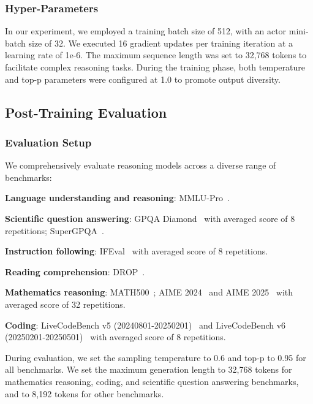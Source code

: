 \documentclass[11pt, a4paper, logo, copyright, nonumbering]{xiaomi}
\begin{document}
\subsubsection{Hyper-Parameters}
In our experiment, we employed a training batch size of 512, with an actor mini-batch size of 32. We executed 16 gradient updates per training iteration at a learning rate of 1e-6. The maximum sequence length was set to 32,768 tokens to facilitate complex reasoning tasks. During the training phase, both temperature and top-p parameters were configured at 1.0 to promote output diversity.






\subsection{Post-Training Evaluation}



\subsubsection{Evaluation Setup}

We comprehensively evaluate reasoning models across a diverse range of benchmarks:

\textbf{Language understanding and reasoning}: MMLU-Pro~\citep{wang2024mmlu}.

\textbf{Scientific question answering}: GPQA Diamond~\citep{rein2024gpqa} with averaged score of 8 repetitions; SuperGPQA~\citep{du2025supergpqa}.

\textbf{Instruction following}: IFEval~\citep{zhou2023instructionfollowingevaluationlargelanguage} with averaged score of 8 repetitions.

\textbf{Reading comprehension}: DROP~\citep{dua2019drop}.

\textbf{Mathematics reasoning}: MATH500~\citep{lightman2023lets}; AIME 2024~\citep{AIME} and AIME 2025~\citep{AIME25} with averaged score of 32 repetitions.

\textbf{Coding}: LiveCodeBench v5 (20240801-20250201)~\citep{jain2024livecodebench} and LiveCodeBench v6 (20250201-20250501)~\citep{jain2024livecodebench} with averaged score of 8 repetitions.


During evaluation, we set the sampling temperature to 0.6 and top-p to 0.95 for all benchmarks. We set the maximum generation length to 32,768 tokens for mathematics reasoning, coding, and scientific question answering benchmarks, and to 8,192 tokens for other benchmarks.
\end{document}
